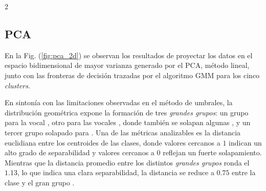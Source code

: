 \documentclass[11pt, letterpaper]{article}
\begin{document}
\begin{multicols*}{2}
\subsection{PCA}

En la Fig. (\ref{fig:pca_2d}) se observan los resultados de proyectar los datos en el espacio bidimensional de mayor varianza generado por el PCA, método lineal, junto con las fronteras de decisión trazadas por el algoritmo GMM \cite{sklearn_gmm} para los cinco \textit{clusters}. %

En sintonía con las limitaciones observadas en el método de umbrales, la distribución geométrica expone la formación de tres \textit{grandes grupos}: un grupo para la vocal , otro para las vocales , donde también se solapan algunas , y un tercer grupo solapado para . Una de las métricas analizables es la distancia euclidiana entre los centroides de las clases, donde valores cercanos a $1$ indican un alto grado de separabilidad y valores cercanos a $0$ reflejan un fuerte solapamiento. Mientras que la distancia promedio entre los distintos \textit{grandes grupos} ronda el $1.13$, lo que indica una clara separabilidad, la distancia se reduce a $0.75$ entre la clase  y el gran grupo .


\end{multicols*}
\end{document}
